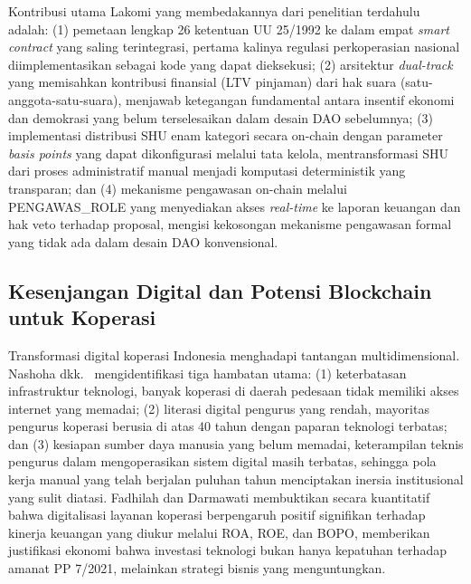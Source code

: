 Kontribusi utama Lakomi yang membedakannya dari penelitian terdahulu adalah: (1) pemetaan lengkap 26 ketentuan UU 25/1992 ke dalam empat \textit{smart contract} yang saling terintegrasi, pertama kalinya regulasi perkoperasian nasional diimplementasikan sebagai kode yang dapat dieksekusi; (2) arsitektur \textit{dual-track} yang memisahkan kontribusi finansial (LTV pinjaman) dari hak suara (satu-anggota-satu-suara), menjawab ketegangan fundamental antara insentif ekonomi dan demokrasi yang belum terselesaikan dalam desain DAO sebelumnya; (3) implementasi distribusi SHU enam kategori secara on-chain dengan parameter \textit{basis points} yang dapat dikonfigurasi melalui tata kelola, mentransformasi SHU dari proses administratif manual menjadi komputasi deterministik yang transparan; dan (4) mekanisme pengawasan on-chain melalui PENGAWAS\_ROLE yang menyediakan akses \textit{real-time} ke laporan keuangan dan hak veto terhadap proposal, mengisi kekosongan mekanisme pengawasan formal yang tidak ada dalam desain DAO konvensional.

\subsection{Kesenjangan Digital dan Potensi Blockchain untuk Koperasi}

Transformasi digital koperasi Indonesia menghadapi tantangan multidimensional. Nashoha dkk.~\cite{nashoha2024transformasi} mengidentifikasi tiga hambatan utama: (1) keterbatasan infrastruktur teknologi, banyak koperasi di daerah pedesaan tidak memiliki akses internet yang memadai; (2) literasi digital pengurus yang rendah, mayoritas pengurus koperasi berusia di atas 40 tahun dengan paparan teknologi terbatas; dan (3) kesiapan sumber daya manusia yang belum memadai, keterampilan teknis pengurus dalam mengoperasikan sistem digital masih terbatas, sehingga pola kerja manual yang telah berjalan puluhan tahun menciptakan inersia institusional yang sulit diatasi. Fadhilah dan Darmawati \cite{fadhilah2023transformasi} membuktikan secara kuantitatif bahwa digitalisasi layanan koperasi berpengaruh positif signifikan terhadap kinerja keuangan yang diukur melalui ROA, ROE, dan BOPO, memberikan justifikasi ekonomi bahwa investasi teknologi bukan hanya kepatuhan terhadap amanat PP 7/2021, melainkan strategi bisnis yang menguntungkan.

